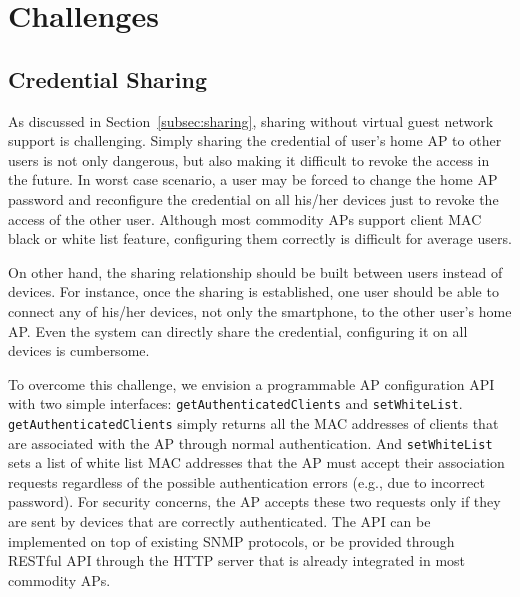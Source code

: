 \section{Challenges}
\label{sec:challenges}

\subsection{Credential Sharing}
\label{subsec:credential}

As discussed in Section~\ref{subsec:sharing}, \wifi{} sharing without virtual
guest network support is challenging. Simply sharing the \wifi{} credential of
user's home AP to other \wisefi{} users is not only dangerous, but also making
it difficult to revoke the access in the future. In worst case scenario, a user
may be forced to change the home AP password and reconfigure the \wifi{}
credential on all his/her devices just to revoke the access of the other
\wisefi{} user. Although most commodity APs support client MAC black or white
list feature, configuring them correctly is difficult for average users.

On other hand, the sharing relationship should be built between users instead of
devices. For instance, once the sharing is established, one user should be able
to connect any of his/her devices, not only the smartphone, to the other user's
home AP. Even the system can directly share the \wifi{} credential, configuring it
on all devices is cumbersome.

To overcome this challenge, we envision a programmable \wifi{} AP configuration
API with two simple interfaces: \texttt{getAuthenticatedClients} and
\texttt{setWhiteList}.  \texttt{getAuthenticatedClients} simply returns all the
MAC addresses of clients that are associated with the AP through normal
authentication. And \texttt{setWhiteList} sets a list of white list MAC addresses
that the AP must accept their association requests regardless of the possible
authentication errors (e.g., due to incorrect \wifi{} password). For security
concerns, the AP accepts these two requests only if they are sent by devices that
are correctly authenticated. The API can be implemented on top of existing SNMP
protocols, or be provided through RESTful API through the HTTP server that
is already integrated in most commodity APs.

